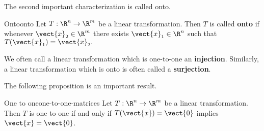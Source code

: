 The second important characterization is called onto.

\begin{definition}{Onto}{onto}
Let $T: \R^n \to \R^m$ be a linear transformation. Then $T$ is called \textbf{onto} if whenever $\vect{x}_2 \in \R^{m}$ there exists
$\vect{x}_1 \in \R^{n}$ such that $T(\vect{x}_1) = \vect{x}_2. $
\end{definition}

We often call a linear transformation which is one-to-one an \textbf{injection}. Similarly, a linear transformation which is onto is often called a \textbf{surjection}.

The following proposition is an important result.

\begin{proposition}{One to one}{one-to-one-matrices}
Let $T:\R^n \to \R^m$ be a linear transformation. Then $T$ is one to one if
and only if $T(\vect{x}) = \vect{0}$ implies $\vect{x}=\vect{0}$.
\end{proposition}

